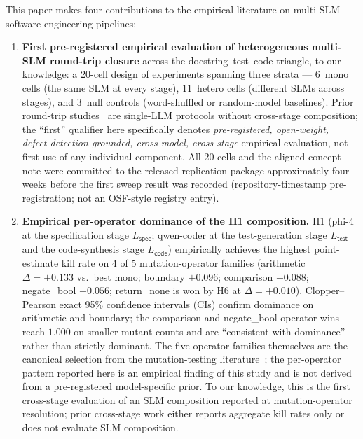 This paper makes four contributions to the empirical literature on multi-SLM software-engineering pipelines:

\begin{enumerate}
  \item \textbf{First pre-registered empirical evaluation of heterogeneous multi-SLM round-trip closure} across the docstring--test--code triangle, to our knowledge: a 20-cell design of experiments spanning three strata --- 6~mono cells (the same SLM at every stage), 11~hetero cells (different SLMs across stages), and 3~null controls (word-shuffled or random-model baselines). Prior round-trip studies~\citep{Allamanis2024RTC, Zhang2025CodingTriangle, Li2024MBCT} are single-LLM protocols without cross-stage composition; the ``first'' qualifier here specifically denotes \emph{pre-registered, open-weight, defect-detection-grounded, cross-model, cross-stage} empirical evaluation, not first use of any individual component. All 20 cells and the aligned concept note were committed to the released replication package approximately four weeks before the first sweep result was recorded (repository-timestamp pre-registration; not an OSF-style registry entry).

  \item \textbf{Empirical per-operator dominance of the H1 composition.} H1 (phi-4 at the specification stage $L_{\textsf{spec}}$; qwen-coder at the test-generation stage $L_{\textsf{test}}$ and the code-synthesis stage $L_{\textsf{code}}$) empirically achieves the highest point-estimate kill rate on 4 of 5 mutation-operator families (arithmetic $\Delta = +0.133$ vs.\ best mono; boundary $+0.096$; comparison $+0.088$; negate\_bool $+0.056$; return\_none is won by H6 at $\Delta = +0.010$). Clopper--Pearson exact 95\% confidence intervals (CIs) confirm dominance on arithmetic and boundary; the comparison and negate\_bool operator wins reach $1.000$ on smaller mutant counts and are ``consistent with dominance'' rather than strictly dominant. The five operator families themselves are the canonical selection from the mutation-testing literature~\citep{Andrews2005MutationAnalysis, Just2014MutationAnalysis}; the per-operator pattern reported here is an empirical finding of this study and is not derived from a pre-registered model-specific prior. To our knowledge, this is the first cross-stage evaluation of an SLM composition reported at mutation-operator resolution; prior cross-stage work either reports aggregate kill rates only or does not evaluate SLM composition.


\end{enumerate}
